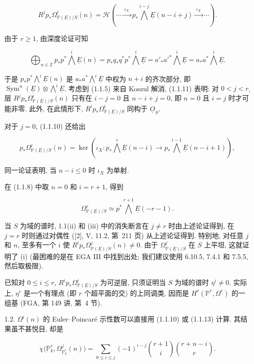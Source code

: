 \begin{equation}\tag{1.1.11}
R^jp_*\Omega^i_{\mathbb P(\underline E)/S}(n)
=\mathcal H\left(\cdots\xrightarrow{\ \iota_X\ }
p_*\bigwedge^{i-j}\underline E(n-i+j)
\xrightarrow{\ \iota_X\ }\cdots\right).
\end{equation}

由于 $r\geq1$, 由深度论证可知

\begin{equation}\tag{1.1.12}
\bigoplus_{n\in\mathbb Z}p_*p^*\bigwedge^i\underline E(n)
=p_*q_*q^*p^*\bigwedge^i\underline E
={a'}_*{a'}^*\bigwedge^i\underline E
=a_*a^*\bigwedge^i\underline E.
\end{equation}


于是 $p_*p^*\bigwedge^i\underline E(n)$ 是 $a_*a^*\bigwedge^i\underline E$ 中权为 $n+i$ 的齐次部分, 即 $\operatorname{Sym}^n(\underline E)\otimes\bigwedge^i\underline E$. 考虑到 (1.1.5) 来自 Koszul 解消, (1.1.11) 表明: 对 $0<j<r$, 层 $R^jp_*\Omega^i_{\mathbb P(\underline E)/S}(n)$ 只有在 $i-j=0$ 且 $n-i+j=0$, 即 $n=0$ 且 $i=j$ 时才可能非零. 此外, 在此情形下, $R^ip_*\Omega^i_{\mathbb P(\underline E)/S}$ 同构于 $\underline O_S$.

对于 $j=0$, (1.1.10) 还给出

\begin{equation}\tag{1.1.13}
p_*\Omega^i_{\mathbb P(\underline E)/S}(n)
=\ker\!\left(\iota_X:
p_*\bigwedge^i\underline E(n-i)\longrightarrow
p_*\bigwedge^{i-1}\underline E(n-i+1)\right),
\end{equation}

同一论证表明, 当 $n-i\leq0$ 时 $\iota_X$ 为单射.

在 (1.1.8) 中取 $n=0$ 和 $i=r+1$, 得到

\begin{equation*}
\Omega^r_{\mathbb P(\underline E)/S}\simeq
p^*\bigwedge^{r+1}\underline E(-r-1).
\end{equation*}

当 $S$ 为域的谱时, 1.1(ii) 和 (iii) 中的消失断言在 $j\ne r$ 时由上述论证得到, 在 $j=r$ 时则通过对偶性 ([2], V, 11.2, 第~211 页) 从上述论证得到. 特别地, 对任意 $j$ 和 $n$, 至多有一个 $i$ 使 $R^ip_*\Omega^j_{\mathbb P(\underline E)/S}(n)\ne0$. 由于 $\Omega^j_{\mathbb P(\underline E)/S}$ 在 $S$ 上平坦, 这就证明了 (i) (最困难的是在 EGA III 中找到出处; 我们建议使用 6.10.5, 7.4.1 和 7.5.5, 然后取极限).

已知对 $0\leq i\leq r$, $R^ip_*\Omega^i_{\mathbb P(\underline E)/S}$ 为可逆层, 只须证明当 $S$ 为域的谱时 $\eta^i\ne0$. 实际上, $\eta^r$ 是一个有理点 (即 $r$ 个超平面的交) 的上同调类, 因而是 $H^r(\mathbb P^r,\Omega^r)$ 的一组基 (FGA, 第 149 讲, 第~4 节).

1.2. $\Omega^i(n)$ 的 Euler--Poincaré 示性数可以直接用 (1.1.10) 或 (1.1.13) 计算. 其结果虽不甚悦目, 却是

\begin{equation*}
\chi\bigl(\mathbb P^r_k,\Omega^j_{\mathbb P^r_k}(n)\bigr)
=\sum_{0\leq i\leq j}(-1)^{i-j}
\binom{r+1}{i}\binom{r+n-i}{r}.
\end{equation*}


